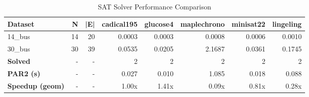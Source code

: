 \begin{table}[htbp]
\centering
\caption{SAT Solver Performance Comparison}
\label{tab:table_solvers}
\begin{tabular}{lrrrrrrr}
\toprule
Dataset & N & |E| & cadical195 & glucose4 & maplechrono & minisat22 & lingeling \\
\midrule
14\_bus & 14 & 20 & 0.0003 & 0.0003 & 0.0008 & 0.0006 & 0.0010 \\
30\_bus & 30 & 39 & 0.0535 & 0.0205 & 2.1687 & 0.0361 & 0.1745 \\
\midrule
\textbf{Solved} & - & - & 2 & 2 & 2 & 2 & 2 \\
\textbf{PAR2 (s)} & - & - & 0.027 & 0.010 & 1.085 & 0.018 & 0.088 \\
\textbf{Speedup (geom)} & - & - & 1.00x & 1.41x & 0.09x & 0.81x & 0.28x \\
\bottomrule
\end{tabular}
\end{table}
